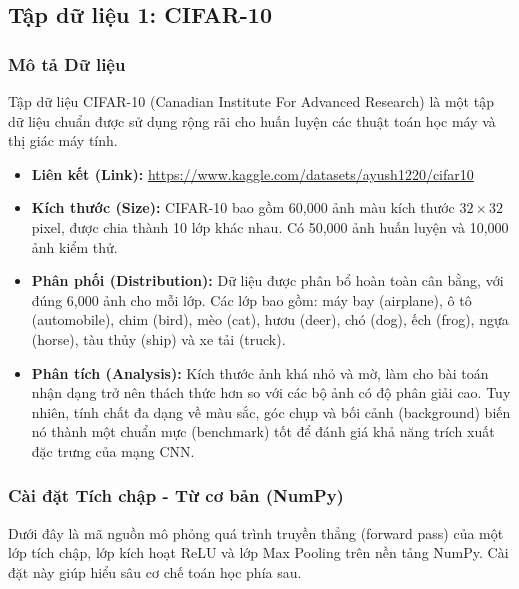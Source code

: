 \documentclass[12pt,a4paper]{article}
\begin{document}
\newpage
\subsection{Tập dữ liệu 1: CIFAR-10}

\subsubsection{Mô tả Dữ liệu}
Tập dữ liệu CIFAR-10 (Canadian Institute For Advanced Research) là một tập dữ liệu chuẩn được sử dụng rộng rãi cho huấn luyện các thuật toán học máy và thị giác máy tính.
\begin{itemize}
    \item \textbf{Liên kết (Link):} \url{https://www.kaggle.com/datasets/ayush1220/cifar10}
    \item \textbf{Kích thước (Size):} CIFAR-10 bao gồm 60,000 ảnh màu kích thước $32 \times 32$ pixel, được chia thành 10 lớp khác nhau. Có 50,000 ảnh huấn luyện và 10,000 ảnh kiểm thử.
    \item \textbf{Phân phối (Distribution):} Dữ liệu được phân bổ hoàn toàn cân bằng, với đúng 6,000 ảnh cho mỗi lớp. Các lớp bao gồm: máy bay (airplane), ô tô (automobile), chim (bird), mèo (cat), hươu (deer), chó (dog), ếch (frog), ngựa (horse), tàu thủy (ship) và xe tải (truck).
    \item \textbf{Phân tích (Analysis):} Kích thước ảnh khá nhỏ và mờ, làm cho bài toán nhận dạng trở nên thách thức hơn so với các bộ ảnh có độ phân giải cao. Tuy nhiên, tính chất đa dạng về màu sắc, góc chụp và bối cảnh (background) biến nó thành một chuẩn mực (benchmark) tốt để đánh giá khả năng trích xuất đặc trưng của mạng CNN.
\end{itemize}

\subsubsection{Cài đặt Tích chập - Từ cơ bản (NumPy)}

Dưới đây là mã nguồn mô phỏng quá trình truyền thẳng (forward pass) của một lớp tích chập, lớp kích hoạt ReLU và lớp Max Pooling trên nền tảng NumPy. Cài đặt này giúp hiểu sâu cơ chế toán học phía sau.
\end{document}
